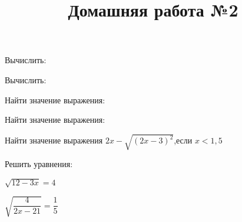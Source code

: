 \newpage
\title{Домашняя работа №2}
\begin{listofex}
	\item Вычислить:
	\begin{enumcols}[itemcolumns=2]
		\item {}
		\item {}
		\item {}
		\item {}
	\end{enumcols}
	\item Вычислить:
	\begin{enumcols}[itemcolumns=2]
		\item {}
		\item {}
	\end{enumcols}
	\item Найти значение выражения:
	\begin{enumcols}[itemcolumns=2]
		\item {}
		\item {}
	\end{enumcols}
	\item {}
	\item Найти значение выражения:
	\begin{enumcols}[itemcolumns=2]
		\item {}
		\item {}
	\end{enumcols}
	\item {}
	\item Найти значение выражения \( 2x-\sqrt{(2x-3)^2} \),\quad если \( x<1,5\)
	\item Решить уравнения:
	\begin{enumcols}[itemcolumns=2]
		\item {}
		\item \( \sqrt{12-3x}=4 \)
		\item \( \sqrt{\dfrac{4}{2x-21}}=\dfrac{1}{5} \)
		\item {}
	\end{enumcols}
\end{listofex}